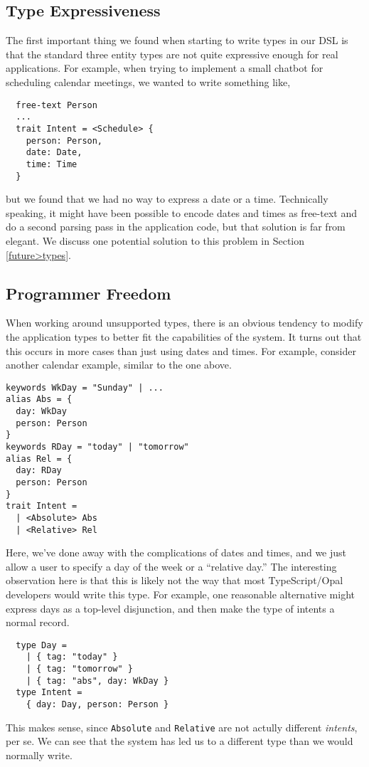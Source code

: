 \documentclass[twocolumn]{article}
\newcommand{\ts}[1]{\texttt{#1}}
\begin{document}
\subsection{Type Expressiveness}
The first important thing we found when starting to write types in our DSL is
that the standard three entity types are not quite expressive enough for real
applications. For example, when trying to implement a small chatbot for
scheduling calendar meetings, we wanted to write something like,
\begin{verbatim}
  free-text Person
  ...
  trait Intent = <Schedule> {
    person: Person,
    date: Date,
    time: Time
  }
\end{verbatim}
but we found that we had no way to express a date or a time. Technically
speaking, it might have been possible to encode dates and times as free-text and
do a second parsing pass in the application code, but that solution is far from
elegant. We discuss one potential solution to this problem in Section
\ref{future>types}.

\subsection{Programmer Freedom}
When working around unsupported types, there is an obvious tendency to modify
the application types to better fit the capabilities of the system. It turns out
that this occurs in more cases than just using dates and times. For example,
consider another calendar example, similar to the one above.
\begin{verbatim}
keywords WkDay = "Sunday" | ...
alias Abs = {
  day: WkDay
  person: Person
}
keywords RDay = "today" | "tomorrow"
alias Rel = {
  day: RDay
  person: Person
}
trait Intent =
  | <Absolute> Abs
  | <Relative> Rel
\end{verbatim}
Here, we've done away with the complications of dates and times, and we just
allow a user to specify a day of the week or a ``relative day.'' The interesting
observation here is that this is likely not the way that most TypeScript/Opal
developers would write this type. For example, one reasonable alternative might
express days as a top-level disjunction, and then make the type of intents a
normal record.
\begin{verbatim}
  type Day =
    | { tag: "today" }
    | { tag: "tomorrow" }
    | { tag: "abs", day: WkDay }
  type Intent =
    { day: Day, person: Person }
\end{verbatim}
This makes sense, since \ts{Absolute} and \ts{Relative} are not actully
different \emph{intents}, per se. We can see that the system has led us to a
different type than we would normally write.
\end{document}
